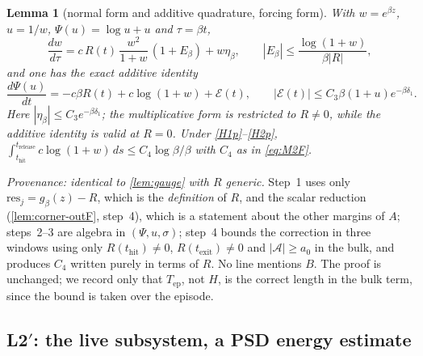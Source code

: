 \documentclass[11pt]{article}
\newtheorem{lemma}[lemma]{Lemma}
\theoremstyle{definition}
\theoremstyle{remark}
\newcommand{\thit}{t_{\mathrm{hit}}}
\newcommand{\texit}{t_{\mathrm{exit}}}
\newcommand{\trel}{t_{\mathrm{release}}}
\newcommand{\Ar}{\mathcal{A}}                      %
\newcommand{\Tep}{T_{\mathrm{ep}}}   %
\newcommand{\res}{\mathrm{res}}
\begin{document}
\begin{lemma}[normal form and additive quadrature, forcing form]\label{lem:gaugeF}
With $w=e^{\beta z}$, $u=1/w$, $\Psi(u)=\log u+u$ and $\tau=\beta t$,
\begin{equation}\label{eq:normalformF}
\frac{dw}{d\tau}=c\,R(t)\,\frac{w^2}{1+w}\,(1+E_\beta)+w\eta_\beta,
\qquad |E_\beta|\le\frac{\log(1+w)}{\beta|R|},
\end{equation}
and one has the exact additive identity
\begin{equation}\label{eq:quadratureF}
\frac{d\Psi(u)}{dt}=-c\beta R(t)+c\log(1+w)+\mathcal E(t),
\qquad
|\mathcal E(t)|\le C_3\beta(1+u)e^{-\beta\delta_1}.
\end{equation}
Here $|\eta_\beta|\le C_3e^{-\beta\delta_1}$; the multiplicative
form is restricted to $R\ne0$, while the additive identity is valid at $R=0$.
Under \textup{\eqref{H1p}--\eqref{H2p}},
$\int_{\thit}^{\trel}c\log(1+w)\,ds\le C_4\log\beta/\beta$ with $C_4$ as in
\eqref{eq:M2F}.
\end{lemma}

\noindent\emph{Provenance: identical to \cref{lem:gauge} with $R$ generic.}
Step~1 uses only $\res_j=g_\beta(z)-R$, which is the \emph{definition} of $R$,
and the scalar reduction (\cref{lem:corner-outF}, step~4), which is a statement
about the other margins of $A$; steps~2--3 are algebra in $(\Psi,u,\sigma)$;
step~4 bounds the correction in three windows using only $R(\thit)\ne0$,
$R(\texit)\ne0$ and $|\Ar|\ge a_0$ in the bulk, and produces $C_4$ written
purely in terms of $R$. No line mentions $B$. The proof is unchanged; we record
only that $\Tep$, not $H$, is the correct length in the bulk term, since the
bound is taken over the episode.

\subsection{L2$'$: the live subsystem, a PSD energy estimate}\label{app:F2}
\end{document}
